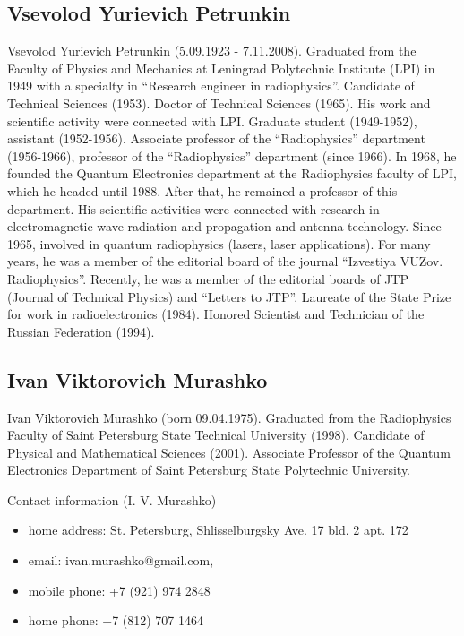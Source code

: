 \subsection{Vsevolod Yurievich Petrunkin}
Vsevolod Yurievich Petrunkin (5.09.1923 - 7.11.2008). Graduated from
the Faculty of Physics and Mechanics at Leningrad Polytechnic Institute (LPI) in 1949 with a specialty in ``Research engineer in radiophysics''. Candidate of Technical Sciences (1953). Doctor of Technical Sciences (1965). His work and scientific activity were connected with LPI. Graduate student (1949-1952), assistant (1952-1956). Associate professor of the ``Radiophysics'' department (1956-1966), professor of the ``Radiophysics''
department (since 1966). In 1968, he founded the Quantum Electronics department
at the Radiophysics faculty of LPI, which he headed until 1988. After that, he remained a professor of this department. His scientific activities were connected with research in electromagnetic wave radiation and propagation and antenna technology. Since 1965, involved in quantum radiophysics (lasers, laser applications). For many years, he was a member of the editorial board of the journal ``Izvestiya VUZov. Radiophysics''. Recently, he was a member of the editorial boards of JTP (Journal of Technical Physics) and ``Letters to JTP''. Laureate of the State Prize for work in radioelectronics (1984). Honored Scientist and Technician of the Russian Federation (1994).
\subsection{Ivan Viktorovich Murashko}
Ivan Viktorovich Murashko (born 09.04.1975). Graduated from the Radiophysics Faculty of Saint Petersburg State Technical University (1998). Candidate of Physical and Mathematical Sciences (2001). Associate Professor of the Quantum Electronics Department of Saint Petersburg State Polytechnic University.

Contact information (I. V. Murashko)
\begin{itemize}
\item home address: St. Petersburg, Shlisselburgsky Ave. 17 bld. 2 apt. 172
\item email: ivan.murashko@gmail.com,
\item mobile phone: +7 (921) 974 2848
\item home phone: +7 (812) 707 1464
\end{itemize}
